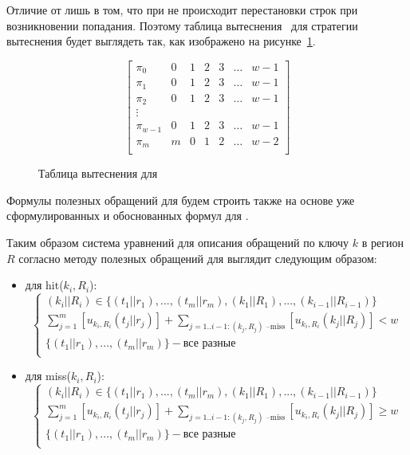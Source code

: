 Отличие от \LRU лишь в том, что при \FIFO не происходит перестановки
строк при возникновении попадания. Поэтому таблица
вытеснения~\cite{policy_tables} для стратегии вытеснения \FIFO будет
выглядеть так, как изображено на рисунке~\ref{fifo_policy_table}.

\begin{figure}[h]
$$
  \left[
    \begin{array}{c|cccccc}
      \pi_0 & 0 & 1 & 2 & 3 & \dots & w{-}1 \\
      \pi_1 & 0 & 1 & 2 & 3 & \dots & w{-}1 \\
      \pi_2 & 0 & 1 & 2 & 3 & \dots & w{-}1 \\
      \vdots &  &  &  & & & \\
      \pi_{w-1} & 0 & 1 & 2 & 3 & \dots & w{-}1 \\
      \pi_m & m & 0 & 1 & 2 & \dots & w{-}2 \\
    \end{array}
  \right]
$$
\caption{Таблица вытеснения для \FIFO}\label{fifo_policy_table}
\end{figure}

Формулы полезных обращений для \FIFO будем строить также на основе уже сформулированных и обоснованных формул для \LRU.


Таким образом система уравнений для описания обращений по ключу $k$ в регион $R$
согласно методу полезных обращений для \FIFO выглядит следующим образом:
\begin{itemize}
\item для hit($k_i, R_i$):
$$
\left\{\begin{array}{l} (k_i||R_i) \in \{(t_1||r_1), ..., (t_m||r_m), (k_1||R_1), ..., (k_{i-1}||R_{i-1})\}\\
\sum\limits_{j=1}^m [u_{k_i,R_i}(t_j||r_j)] + \sum\limits_{j=1..{i-1}:(k_j,R_j)\mbox{~--miss}} [u_{k_i,R_i}(k_j||R_j)] < w\\
\{(t_1||r_1), ..., (t_m||r_m)\} - \mbox{все разные}\\
\end{array} \right.
$$
\item для miss($k_i, R_i$):
$$
\left\{\begin{array}{l} (k_i||R_i) \in \{(t_1||r_1), ..., (t_m||r_m), (k_1||R_1), ..., (k_{i-1}||R_{i-1})\}\\
\sum\limits_{j=1}^m [u_{k_i,R_i}(t_j||r_j)] + \sum\limits_{j=1..{i-1}:(k_j,R_j)\mbox{~--miss}} [u_{k_i,R_i}(k_j||R_j)] \geqslant w\\
\{(t_1||r_1), ..., (t_m||r_m)\} - \mbox{все разные}\\
\end{array} \right.
$$
\end{itemize}

